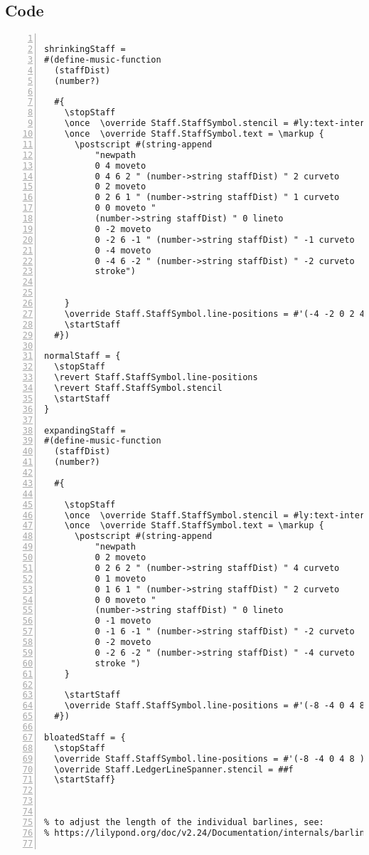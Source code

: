 \subsection{Code}
\begin{Verbatim}[numbers=left,xleftmargin=5mm]

shrinkingStaff =
#(define-music-function
  (staffDist)
  (number?)

  #{
    \stopStaff
    \once  \override Staff.StaffSymbol.stencil = #ly:text-interface::print
    \once  \override Staff.StaffSymbol.text = \markup {
      \postscript #(string-append
          "newpath 
          0 4 moveto 
          0 4 6 2 " (number->string staffDist) " 2 curveto 
          0 2 moveto 
          0 2 6 1 " (number->string staffDist) " 1 curveto
          0 0 moveto "
          (number->string staffDist) " 0 lineto
          0 -2 moveto 
          0 -2 6 -1 " (number->string staffDist) " -1 curveto
          0 -4 moveto
          0 -4 6 -2 " (number->string staffDist) " -2 curveto
          stroke")


    }    
    \override Staff.StaffSymbol.line-positions = #'(-4 -2 0 2 4 )
    \startStaff
  #})

normalStaff = {
  \stopStaff 
  \revert Staff.StaffSymbol.line-positions 
  \revert Staff.StaffSymbol.stencil 
  \startStaff
}

expandingStaff =
#(define-music-function
  (staffDist)
  (number?)

  #{

    \stopStaff
    \once  \override Staff.StaffSymbol.stencil = #ly:text-interface::print
    \once  \override Staff.StaffSymbol.text = \markup {
      \postscript #(string-append 
          "newpath 
          0 2 moveto 
          0 2 6 2 " (number->string staffDist) " 4 curveto 
          0 1 moveto
          0 1 6 1 " (number->string staffDist) " 2 curveto 
          0 0 moveto "
          (number->string staffDist) " 0 lineto
          0 -1 moveto 
          0 -1 6 -1 " (number->string staffDist) " -2 curveto 
          0 -2 moveto
          0 -2 6 -2 " (number->string staffDist) " -4 curveto
          stroke ")
    }

    \startStaff
    \override Staff.StaffSymbol.line-positions = #'(-8 -4 0 4 8 )
  #})

bloatedStaff = {
  \stopStaff  
  \override Staff.StaffSymbol.line-positions = #'(-8 -4 0 4 8 )   
  \override Staff.LedgerLineSpanner.stencil = ##f 
  \startStaff}



% to adjust the length of the individual barlines, see:
% https://lilypond.org/doc/v2.24/Documentation/internals/barline


\end{Verbatim}
